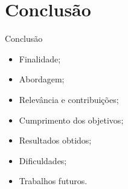 \section{Conclusão}

\begin{frame}{Conclusão}
    \begin{itemize}
        \item Finalidade; \vspace{0.5cm}
        \item Abordagem; \vspace{0.5cm}
        \item Relevância e contribuições; \vspace{0.5cm}
        \item Cumprimento dos objetivos; \vspace{0.5cm}
        \item Resultados obtidos; \vspace{0.5cm}
        \item Dificuldades; \vspace{0.5cm}
        \item Trabalhos futuros. \vspace{0.5cm}
    \end{itemize}
\end{frame}